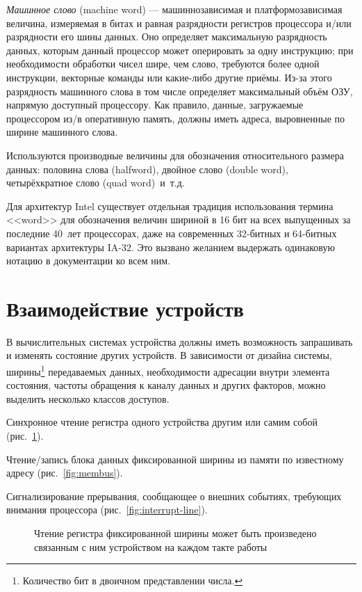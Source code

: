 \textit{Машинное слово} (\abbr machine word) — машиннозависимая и платформозависимая величина, измеряемая в битах и равная разрядности регистров процессора и/или разрядности его шины данных. Оно определяет максимальную разрядность данных, которым данный процессор может оперировать за одну инструкцию; при необходимости обработки чисел шире, чем слово, требуются более одной инструкции, векторные команды или какие-либо другие приёмы. Из-за этого разрядность машинного слова в том числе определяет максимальный объём ОЗУ, напрямую доступный процессору. Как правило, данные, загружаемые процессором из/в оперативную память, должны иметь адреса, выровненные по ширине машинного слова.

Используются производные величины для обозначения относительного размера данных: половина слова (\abbr halfword), двойное слово (\abbr double word), четырёхкратное слово (\abbr quad word)~и~т.д.

Для архитектур Intel существует отдельная традиция использования термина <<word>> для обозначения величин шириной в 16 бит на всех выпущенных за последние 40~лет процессорах, даже на современных 32-битных и 64-битных вариантах архитектуры IA-32. Это вызвано желанием выдержать одинаковую нотацию в документации ко всем ним.

\section{Взаимодействие устройств}

В вычислительных системах устройства должны иметь возможность запрашивать и изменять состояние других устройств. В зависимости от дизайна системы, ширины\footnote{Количество бит в двоичном представлении числа.} передаваемых данных, необходимости адресации внутри элемента состояния, частоты обращения к каналу данных и других факторов, можно выделить несколько классов доступов.

\begin{itemize*}
\item Синхронное чтение регистра одного устройства другим или самим собой (рис.~\ref{fig:register}).
\item Чтение/запись блока данных фиксированной ширины из памяти по известному адресу (рис.~\ref{fig:membus}). 
\item Сигнализирование прерывания, сообщающее о внешних событиях, требующих внимания процессора (рис.~\ref{fig:interrupt-line}).
\end{itemize*}

\begin{figure}[htb]
    \centering
    \caption[Чтение регистра]{Чтение регистра фиксированной ширины может быть произведено связанным с ним устройством на каждом такте работы}
    \label{fig:register}
\end{figure}

